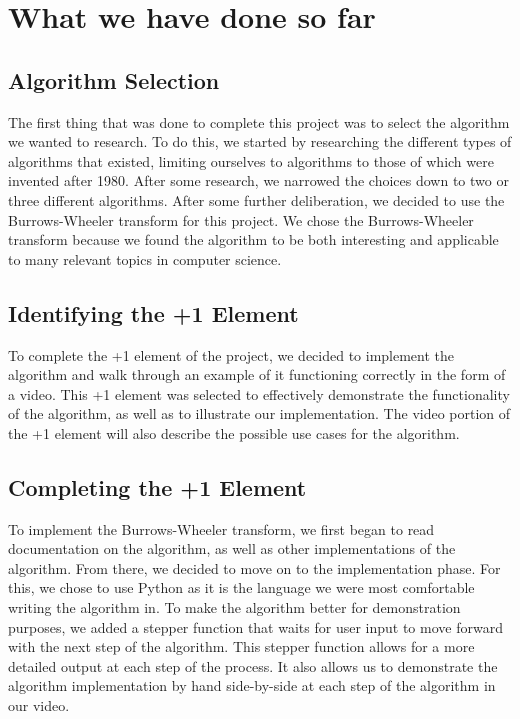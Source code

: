 \documentclass{article}
\begin{document}
   \section{What we have done so far}
   
   \subsection{Algorithm Selection}
   The first thing that was done to complete this project was to select the algorithm we wanted to research. To do this, we started by researching the different types of algorithms that existed, limiting ourselves to algorithms to those of which were invented after 1980. After some research, we narrowed the choices down to two or three different algorithms. After some further deliberation, we decided to use the Burrows-Wheeler transform for this project. We chose the Burrows-Wheeler transform because we found the algorithm to be both interesting and applicable to many relevant topics in computer science.
   
   \subsection{Identifying the +1 Element}
   To complete the +1 element of the project, we decided to implement the algorithm and walk through an example of it functioning correctly in the form of a video. This +1 element was selected to effectively demonstrate the functionality of the algorithm, as well as to illustrate our implementation. The video portion of the +1 element will also describe the possible use cases for the algorithm.
   
   \subsection{Completing the +1 Element}
   To implement the Burrows-Wheeler transform, we first began to read documentation on the algorithm, as well as other implementations of the algorithm. From there, we decided to move on to the implementation phase. For this, we chose to use Python as it is the language we were most comfortable writing the algorithm in. To make the algorithm better for demonstration purposes, we added a stepper function that waits for user input to move forward with the next step of the algorithm. This stepper function allows for a more detailed output at each step of the process. It also allows us to demonstrate the algorithm implementation by hand side-by-side at each step of the algorithm in our video.
   
\end{document}
